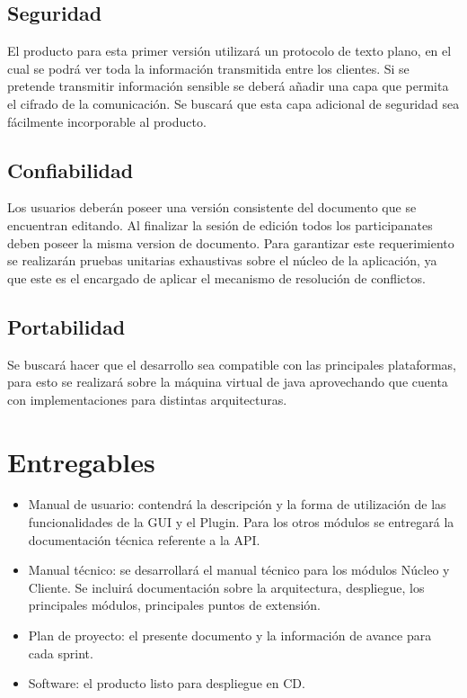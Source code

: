 \documentclass[12pt,a4paper]{article}
\begin{document}
\subsection{Seguridad} El producto para esta primer versión utilizará un protocolo de texto plano, en el cual se podrá ver toda la información transmitida entre los clientes. Si se pretende transmitir información sensible se deberá añadir una capa que permita el cifrado de la comunicación. Se buscará que esta capa adicional de seguridad sea fácilmente incorporable al producto.

\subsection{Confiabilidad} Los usuarios deberán poseer una versión consistente del documento que se encuentran editando. Al finalizar la sesión de edición todos los participanates deben poseer la misma version de documento. Para garantizar este requerimiento se realizarán pruebas unitarias exhaustivas sobre el núcleo de la aplicación, ya que este es el encargado de aplicar el mecanismo de resolución de conflictos.

\subsection{Portabilidad} Se buscará hacer que el desarrollo sea compatible con las principales plataformas, para esto se realizará sobre la máquina virtual de java aprovechando que cuenta con implementaciones para distintas arquitecturas.	
	
	\section{Entregables}

	\begin{itemize}
	\item Manual de usuario: contendrá la descripción y la forma de utilización de las funcionalidades de la GUI y el Plugin. Para los otros módulos se entregará la documentación técnica referente a la API.
	\item Manual técnico: se desarrollará el manual técnico para los módulos Núcleo y Cliente. Se incluirá documentación sobre la arquitectura, despliegue, los principales módulos, principales puntos de extensión.
	\item Plan de proyecto: el presente documento y la información de avance para cada sprint.
	\item Software: el producto listo para despliegue en CD.
	\end{itemize}
\end{document}
